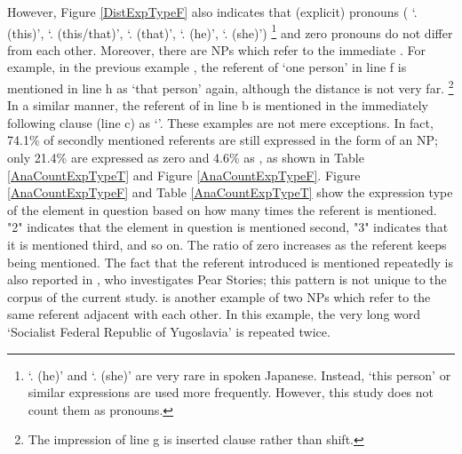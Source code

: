 However,
Figure \ref{DistExpTypeF} also indicates that
(explicit) pronouns ( `. (this)',  `. (this/that)',  `. (that)',  `. (he)',  `. (she)')%
	\footnote{
	 `. (he)' and  `. (she)' are very rare in spoken Japanese.
	Instead,  `this person' or similar expressions are used more frequently.
	However, this study does not count them as pronouns.
	}
and zero pronouns do not differ from each other.
Moreover, there are NPs which refer to the immediate .
For example, in the previous example \Last,
the referent of  `one person' in line f is mentioned in line h as  `that person' again,
although the distance is not very far.%
	\footnote{
	The impression of line g is inserted clause rather than  shift.
	}
In a similar manner,
the referent of  in line b is mentioned in the immediately following clause (line c) as  `'.
These examples are not mere exceptions.
In fact, 74.1\% of secondly mentioned referents are still expressed in the form of an NP;
only 21.4\% are expressed as zero and 4.6\% as ,
as shown in Table \ref{AnaCountExpTypeT} and Figure \ref{AnaCountExpTypeF}.
Figure \ref{AnaCountExpTypeF} and Table \ref{AnaCountExpTypeT} show
the expression type of the element in question based on how many times the referent is mentioned.
"2" indicates that the element in question is mentioned second,
"3" indicates that it is mentioned third, and so on.
The ratio of zero increases as the referent keeps being mentioned.
The fact that the referent introduced is mentioned repeatedly is also reported in , who investigates Pear Stories;
this pattern is not unique to the corpus of the current study.
\Next is another example
of two NPs which refer to the same referent adjacent with each other.
In this example,
the very long word  `Socialist Federal Republic of Yugoslavia' is repeated twice.
